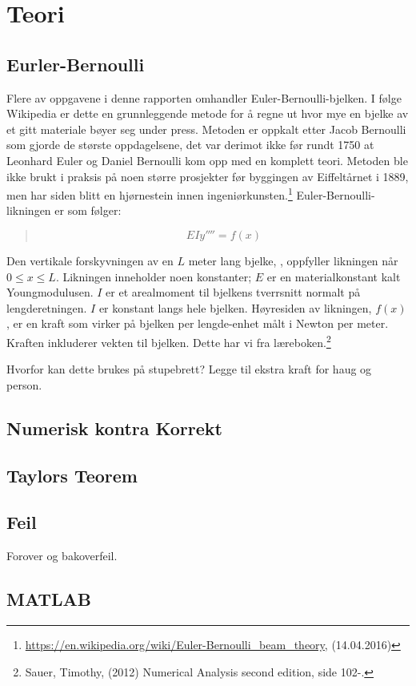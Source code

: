 \section{Teori}

\subsection{Eurler-Bernoulli}
Flere av oppgavene i denne rapporten omhandler Euler-Bernoulli-bjelken. I følge Wikipedia er dette en grunnleggende metode for å regne ut hvor mye en bjelke av et gitt materiale bøyer seg under press. Metoden er oppkalt etter Jacob Bernoulli som gjorde de største oppdagelsene, det var derimot ikke før rundt 1750 at Leonhard Euler og Daniel Bernoulli kom opp med en komplett teori. Metoden ble ikke brukt i praksis på noen større prosjekter før byggingen av Eiffeltårnet i 1889, men har siden blitt en hjørnestein innen ingeniørkunsten.\footnote{\url{https://en.wikipedia.org/wiki/Euler-Bernoulli_beam_theory}, (14.04.2016)} Euler-Bernoulli-likningen er som følger:
\begin{quote}
\begin{equation}
EIy''''=f(x)
\end{equation}
\end{quote}
Den vertikale forskyvningen av en $L$ meter lang bjelke, , oppfyller likningen når $0\leq x\leq L$. Likningen inneholder noen konstanter; $E$ er en materialkonstant kalt Youngmodulusen. $I$ er et arealmoment til bjelkens tverrsnitt normalt på lengderetningen. $I$ er konstant langs hele bjelken. Høyresiden av likningen, $f(x)$, er en kraft som virker på bjelken per lengde-enhet målt i Newton per meter. Kraften inkluderer vekten til bjelken. Dette har vi fra læreboken.\footnote{Sauer, Timothy, (2012) Numerical Analysis second edition, side 102-.}

Hvorfor kan dette brukes på stupebrett?
Legge til ekstra kraft for haug og person.

\subsection{Numerisk kontra Korrekt}

\subsection{Taylors Teorem}

\subsection{Feil}
Forover og bakoverfeil.
 
\subsection{MATLAB}
